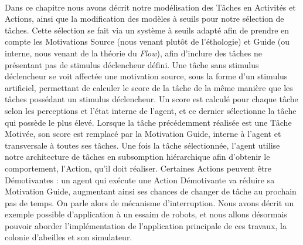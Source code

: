 		\paragraph{}
		Dans ce chapitre nous avons décrit notre modélisation des Tâches en Activités et Actions, ainsi que la modification des modèles à seuils pour notre sélection de tâches. Cette sélection se fait via un système à seuils adapté afin de prendre en compte les Motivations Source (nous venant plutôt de l'éthologie) et Guide (ou interne, nous venant de la théorie du \textit{Flow}), afin d'inclure des tâches ne présentant pas de stimulus déclencheur défini. Une tâche sans stimulus déclencheur se voit affectée une motivation source, sous la forme d'un stimulus artificiel, permettant de calculer le score de la tâche de la même manière que les tâches possédant un stimulus déclencheur. Un score est calculé pour chaque tâche selon les perceptions et l'état interne de l'agent, et ce dernier sélectionne la tâche qui possède le plus élevé. Lorsque la tâche précédemment réalisée est une Tâche Motivée, son score est remplacé par la Motivation Guide, interne à l'agent et transversale à toutes ses tâches. Une fois la tâche sélectionnée, l'agent utilise notre architecture de tâches en subsomption hiérarchique afin d'obtenir le comportement, l'Action, qu'il doit réaliser. Certaines Actions peuvent être Démotivantes : un agent qui exécute une Action Démotivante va réduire sa Motivation Guide, augmentant ainsi ses chances de changer de tâche au prochain pas de temps. On parle alors de mécanisme d'interruption. Nous avons décrit un exemple possible d'application à un essaim de robots, et nous allons désormais pouvoir aborder l'implémentation de l'application principale de ces travaux, la colonie d'abeilles et son simulateur.

